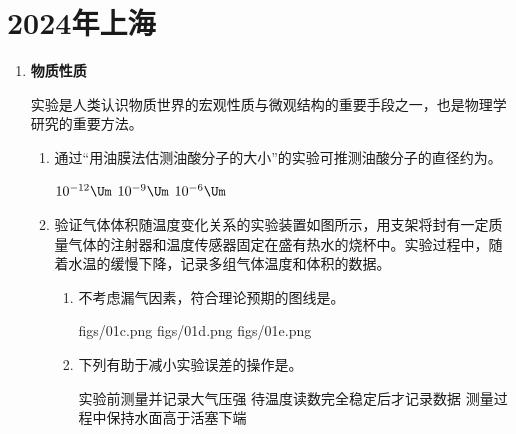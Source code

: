 \documentclass[\gkver]{gaokaozhenti}
\begin{document}
\chapter{2024年上海}

\begin{enumerate}
\item
\textbf{物质性质}

实验是人类认识物质世界的宏观性质与微观结构的重要手段之一，也是物理学研究的重要方法。
\begin{enumerate}
	\item
	通过“用油膜法估测油酸分子的大小”的实验可推测油酸分子的直径约为。

	{$10^{-12} \Um$}
	{$10^{-9} \Um$}
	{$10^{-6} \Um$}

	\item
	验证气体体积随温度变化关系的实验装置如图所示，用支架将封有一定质量气体的注射器和温度传感器固定在盛有热水的烧杯中。实验过程中，随着水温的缓慢下降，记录多组气体温度和体积的数据。

	\onepicture[align=right, h=3.60cm]{}
	\begin{enumerate}
		\item
		不考虑漏气因素，符合理论预期的图线是。

		{figs/01c.png}
		{figs/01d.png}
		{figs/01e.png}

		\item
		下列有助于减小实验误差的操作是。

		{实验前测量并记录大气压强}
		{待温度读数完全稳定后才记录数据}
		{测量过程中保持水面高于活塞下端}
	\end{enumerate}
\end{enumerate}
\end{enumerate}
\end{document}
